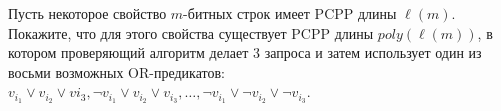\begin{task}
    Пусть некоторое свойство $m$-битных строк имеет PCPP длины $\ell(m)$. Покажите, что для этого свойства существует PCPP длины
    $poly(\ell(m))$, в котором проверяющий алгоритм делает 3 запроса и затем использует один из восьми возможных OR-предикатов:
    $v_{i_1} \lor v_{i_2} \lor v{i_3}, \lnot v_{i_1} \lor v_{i_2} \lor v_{i_3}, \dots, \lnot v_{i_1} \lor \lnot v_{i_2} \lor \lnot
    v_{i_3}$.
\end{task}


